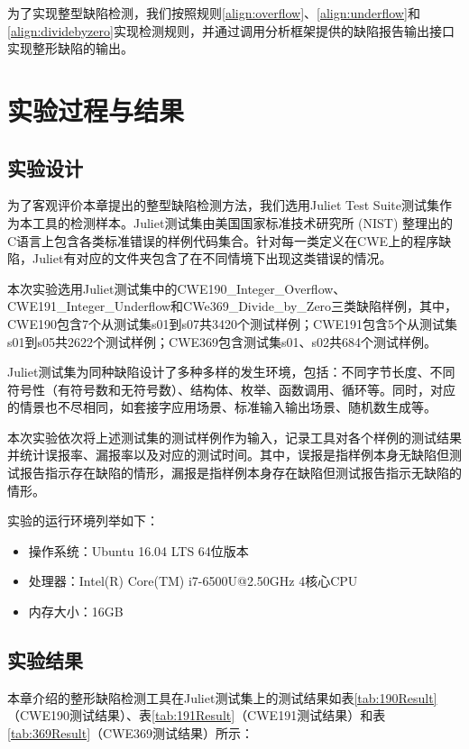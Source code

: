 为了实现整型缺陷检测，我们按照规则\ref{align:overflow}、\ref{align:underflow}和\ref{align:dividebyzero}实现检测规则，并通过调用分析框架提供的缺陷报告输出接口实现整形缺陷的输出。


\section{实验过程与结果}

\subsection{实验设计}

为了客观评价本章提出的整型缺陷检测方法，我们选用Juliet Test Suite测试集作为本工具的检测样本。Juliet测试集由美国国家标准技术研究所 (NIST) 整理出的C语言上包含各类标准错误的样例代码集合。针对每一类定义在CWE上的程序缺陷，Juliet有对应的文件夹包含了在不同情境下出现这类错误的情况。

本次实验选用Juliet测试集中的CWE190\_Integer\_Overflow、CWE191\_Integer\_Underflow和CWe369\_Divide\_by\_Zero三类缺陷样例，其中，CWE190包含7个从测试集s01到s07共3420个测试样例；CWE191包含5个从测试集s01到s05共2622个测试样例；CWE369包含测试集s01、s02共684个测试样例。

Juliet测试集为同种缺陷设计了多种多样的发生环境，包括：不同字节长度、不同符号性（有符号数和无符号数）、结构体、枚举、函数调用、循环等。同时，对应的情景也不尽相同，如套接字应用场景、标准输入输出场景、随机数生成等。

本次实验依次将上述测试集的测试样例作为输入，记录工具对各个样例的测试结果并统计误报率、漏报率以及对应的测试时间。其中，误报是指样例本身无缺陷但测试报告指示存在缺陷的情形，漏报是指样例本身存在缺陷但测试报告指示无缺陷的情形。

实验的运行环境列举如下：
\begin{itemize}
	\item 操作系统：Ubuntu 16.04 LTS 64位版本
	\item 处理器：Intel(R) Core(TM) i7-6500U@2.50GHz 4核心CPU
	\item 内存大小：16GB
\end{itemize}

\subsection{实验结果}

本章介绍的整形缺陷检测工具在Juliet测试集上的测试结果如表\ref{tab:190Result}（CWE190测试结果）、表\ref{tab:191Result}（CWE191测试结果）和表\ref{tab:369Result}（CWE369测试结果）所示：

